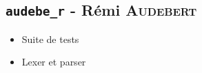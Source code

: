 \subsection{\texttt{audebe\_r} - Rémi \textsc{Audebert}}

\begin{itemize}
    \item Suite de tests
    \item Lexer et parser
\end{itemize}
